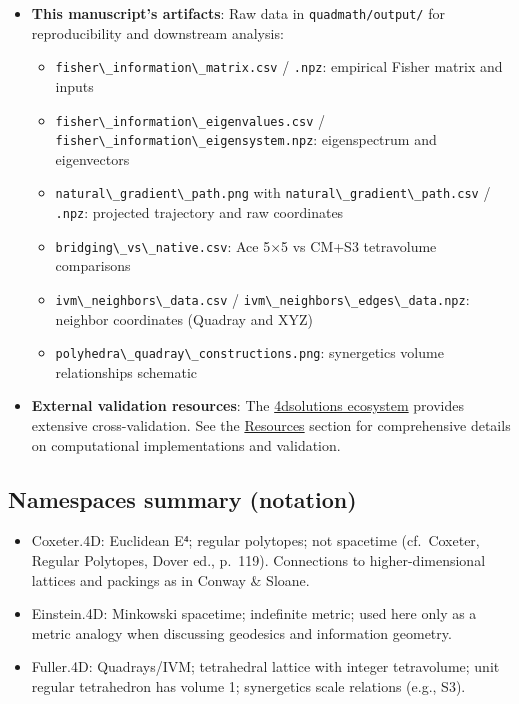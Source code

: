 \documentclass[
  10pt,
]{article}
\newcommand{\passthrough}[1]{#1}
\providecommand{\tightlist}{%
  \setlength{\itemsep}{0pt}\setlength{\parskip}{0pt}}
\begin{document}
\begin{itemize}
\tightlist
\item
  \textbf{This manuscript's artifacts}: Raw data in
  \passthrough{\lstinline!quadmath/output/!} for reproducibility and
  downstream analysis:

  \begin{itemize}
  \item
    \passthrough{\lstinline!fisher\_information\_matrix.csv!} /
    \passthrough{\lstinline!.npz!}: empirical Fisher matrix and inputs
  \item
    \passthrough{\lstinline!fisher\_information\_eigenvalues.csv!} /
    \passthrough{\lstinline!fisher\_information\_eigensystem.npz!}:
    eigenspectrum and eigenvectors
  \item
    \passthrough{\lstinline!natural\_gradient\_path.png!} with
    \passthrough{\lstinline!natural\_gradient\_path.csv!} /
    \passthrough{\lstinline!.npz!}: projected trajectory and raw
    coordinates
  \item
    \passthrough{\lstinline!bridging\_vs\_native.csv!}: Ace 5×5 vs CM+S3
    tetravolume comparisons
  \item
    \passthrough{\lstinline!ivm\_neighbors\_data.csv!} /
    \passthrough{\lstinline!ivm\_neighbors\_edges\_data.npz!}: neighbor
    coordinates (Quadray and XYZ)
  \item
    \passthrough{\lstinline!polyhedra\_quadray\_constructions.png!}:
    synergetics volume relationships schematic
  \end{itemize}
\item
  \textbf{External validation resources}: The
  \href{https://github.com/4dsolutions}{4dsolutions ecosystem} provides
  extensive cross-validation. See the \href{07_resources.md}{Resources}
  section for comprehensive details on computational implementations and
  validation.
\end{itemize}

\hypertarget{namespaces-summary-notation}{%
\subsection{Namespaces summary
(notation)}\label{namespaces-summary-notation}}

\begin{itemize}
\tightlist
\item
  Coxeter.4D: Euclidean E⁴; regular polytopes; not spacetime
  (cf.~Coxeter, Regular Polytopes, Dover ed., p.~119). Connections to
  higher-dimensional lattices and packings as in Conway \& Sloane.
\item
  Einstein.4D: Minkowski spacetime; indefinite metric; used here only as
  a metric analogy when discussing geodesics and information geometry.
\item
  Fuller.4D: Quadrays/IVM; tetrahedral lattice with integer tetravolume;
  unit regular tetrahedron has volume 1; synergetics scale relations
  (e.g., S3).
\end{itemize}
\end{document}
